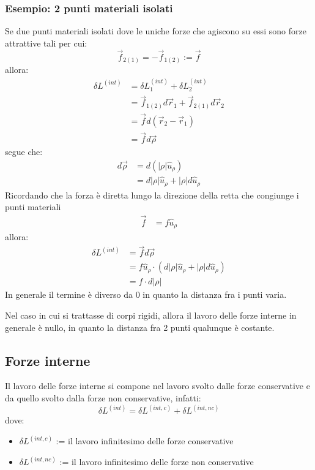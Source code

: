 \documentclass[11pt, a4paper, openright]{book}
\theoremstyle{plain}
\theoremstyle{definition}
\begin{document}
\subsubsection{Esempio: 2 punti materiali isolati}
Se due punti materiali isolati dove le uniche forze che agiscono su essi sono forze attrattive tali per cui:
\begin{equation}
    \vec{f}_{2(1)} = - \vec{f}_{1(2)} := \vec{f} 
\end{equation}
allora:
\begin{align}
    \delta L^{(int)} & = \delta L_1^{(int)} + \delta L_2^{(int)} \\
                     & = \vec{f}_{1(2)} d\vec{r}_1 + \vec{f}_{2(1)} d\vec{r}_2 \\
                     & = \vec{f} d(\vec{r}_2 - \vec{r}_1) \\
                     & = \vec{f} d\vec{\rho}
\end{align}
segue che:
\begin{align}
    d\vec{\rho} & = d(|\rho| \hat{u}_\rho) \\
                & = d|\rho| \hat{u}_\rho + |\rho|d\hat{u}_\rho
\end{align}
Ricordando che la forza è diretta lungo la direzione della retta che congiunge i punti materiali
\begin{align}
    \vec{f} &= f\hat{u}_\rho
\end{align}
allora:
\begin{align}
    \delta L^{(int)} & = \vec{f} d\vec{\rho} \\
                     & = f \hat{u}_\rho \cdot (d|\rho| \hat{u}_\rho + |\rho|d\hat{u}_\rho) \\
                     & = f \cdot d|\rho|
\end{align}
In generale il termine è diverso da 0 in quanto la distanza fra i punti varia.

Nel caso in cui si trattasse di corpi rigidi, allora il lavoro delle forze interne in generale è nullo, in quanto la distanza fra 2 punti qualunque è costante.

\subsection{Forze interne}
Il lavoro delle forze interne si compone nel lavoro svolto dalle forze conservative e da quello svolto dalla forze non conservative, infatti:
\begin{equation}
    \delta L^{(int)} = \delta L^{(int, c)} + \delta L^{(int, nc)}
\end{equation}
dove:
\begin{itemize}
    \item $\delta L^{(int, c)}$ := il lavoro infinitesimo delle forze conservative
    \item $\delta L^{(int, nc)}$ := il lavoro infinitesimo delle forze non conservative
\end{itemize}
\end{document}
